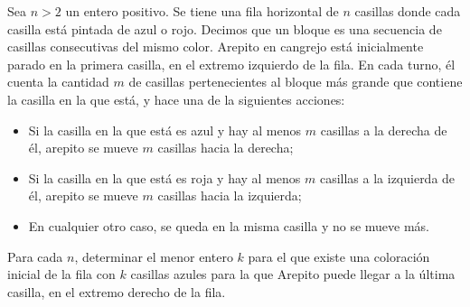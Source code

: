 Sea $n\gt 2$ un entero positivo. Se tiene una fila horizontal de $n$ casillas donde cada casilla está pintada de azul o rojo. Decimos que un bloque es una secuencia de casillas consecutivas del mismo color. Arepito en cangrejo está inicialmente parado en la primera casilla, en el extremo izquierdo de la fila. En cada turno, él cuenta la cantidad $m$ de casillas pertenecientes al bloque más grande que contiene la casilla en la que está, y hace una de la siguientes acciones:
 \begin{itemize} 
 \item  Si la casilla en la que está es azul y hay al menos $m$ casillas a la derecha de él, arepito se mueve $m$ casillas hacia la derecha;
 \item  Si la casilla en la que está es roja y hay al menos $m$ casillas a la izquierda de él, arepito se mueve $m$ casillas hacia la izquierda;
 \item  En cualquier otro caso, se queda en la misma casilla y no se mueve más.
 \end{itemize} 
Para cada $n$, determinar el menor entero $k$ para el que existe una coloración inicial de la fila con $k$ casillas azules para la que Arepito puede llegar a la última casilla, en el extremo derecho de la fila.